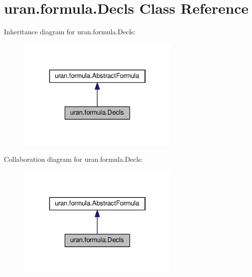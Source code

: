 \hypertarget{classuran_1_1formula_1_1_decls}{}\section{uran.\+formula.\+Decls Class Reference}
\label{classuran_1_1formula_1_1_decls}


Inheritance diagram for uran.\+formula.\+Decls\+:
\nopagebreak
\begin{figure}[H]
\begin{center}
\leavevmode
\includegraphics[width=226pt]{classuran_1_1formula_1_1_decls__inherit__graph}
\end{center}
\end{figure}


Collaboration diagram for uran.\+formula.\+Decls\+:
\nopagebreak
\begin{figure}[H]
\begin{center}
\leavevmode
\includegraphics[width=226pt]{classuran_1_1formula_1_1_decls__coll__graph}
\end{center}
\end{figure}
